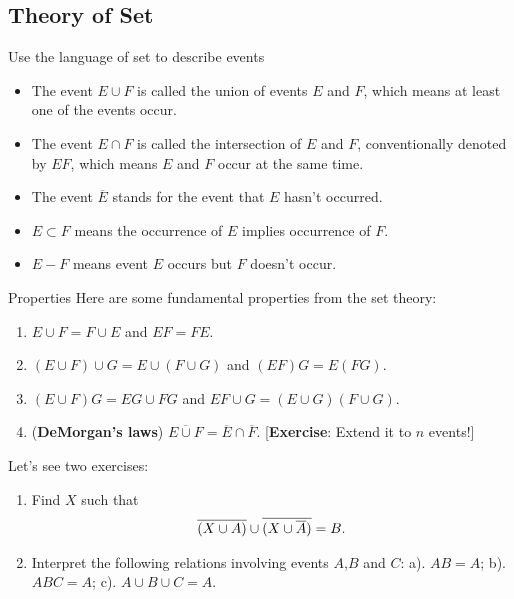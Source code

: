 \subsection{Theory of Set}

\begin{frame}{Use the language of set to describe events}
	\bd
		\begin{itemize}
			\item The event $E\cup F$ is called the union of events $E$ and $F$, which means at least one of the events occur.
			\item  The event $E\cap F$ is called the intersection of $E$ and $F$, conventionally denoted by $EF$, which means $E$ and $F$ occur at the same time.
			\item  The event $\overline E$ stands for the event that $E$ hasn't occurred. 
			\item $E\subset F$ means the occurrence of $E$ implies occurrence of $F$.
			\item $E-F$ means event $E$ occurs but $F$ doesn't occur.
		\end{itemize}
		
	\ed
\end{frame}

\begin{frame}{Properties}
	Here are some fundamental properties from the set theory:
	\begin{enumerate}
		\item $E\cup F=F\cup E$ and $EF=FE$.
		\item $(E\cup F)\cup G=E\cup (F\cup G)$ and $(EF)G=E(FG)$.
		\item $(E\cup F)G=EG\cup FG$ and $EF\cup G=(E\cup G)(F\cup G)$.
		\item (\textbf{DeMorgan's laws}) $\overline{E\cup F}=\overline E\cap \overline F$. [\textbf{Exercise}: Extend it to $n$ events!]
	\end{enumerate}
Let's see two exercises:
\begin{enumerate}
	\item Find $X$ such that 
	\begin{align*}
		\overline{(X\cup A)}\cup \overline{(X\cup \overline A)}=B.
	\end{align*}
\item Interpret the following relations involving events $A$,$B$ and $C$:
a). $AB=A$; b). $ABC=A$; c). $A\cup B\cup C=A$.
\end{enumerate}

\end{frame}

